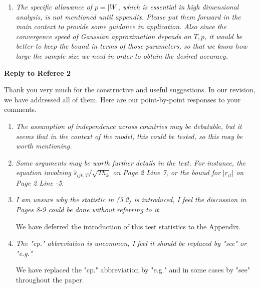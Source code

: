 \documentclass[a4paper,12pt]{article}
\begin{document}
\begin{enumerate}[label=(\arabic*),leftmargin=0.7cm]
\begin{enumerate}[label=(\roman*)]
\item \textit{The argument about no need for time dependent data is reasonable, just a short comment: there already exists result extending Chernozukov et al's GA to time dependent case, maybe this paper can be further extended to time dependent data as well.}
\end{enumerate}

\item \textit{The specific allowance of $p = |W|$, which is essential in high dimensional analysis, is not mentioned until appendix. Please put them forward in the main context to provide some guidance in application. Also since the convergence speed of Gaussian approximation depends on $T, p$, it would be better to keep the bound in terms of those parameters, so that we know how large the sample size we need in order to obtain the desired accuracy.}

\end{enumerate}



\newpage
\begin{center}
{\large \bf Reply to Referee 2} 
\end{center}


Thank you very much for the constructive and useful suggestions. In our revision, we have addressed all of them. Here are our point-by-point responses to your comments. 


\begin{enumerate}[label=(\arabic*),leftmargin=0.7cm]

\item \textit{The assumption of independence across countries may be debatable, but it seems that in the context of the model, this could be tested, so this may be worth mentioning.}

\item \textit{Some arguments may be worth further details in the text. For instance, the equation involving} $\widehat{s}_{ijk,T} / \sqrt{T h_k}$ \textit{on Page 2 Line 7, or the bound for} $|r_{it}|$ \textit{on Page 2 Line -5.}

\item \textit{I am unsure why the statistic in (3.2) is introduced, I feel the discussion in Pages 8-9 could be done without referring to it.}

We have deferred the introduction of this test statistics to the Appendix.

\item \textit{The "cp." abbreviation is uncommon, I feel it should be replaced by "see" or "e.g."}

We have replaced the "cp." abbreviation by "e.g." and in some cases by "see" throughout the paper.
 

\end{enumerate}



\newpage

{\small
\setlength{\bibsep}{0.45em}
}
\end{document}
